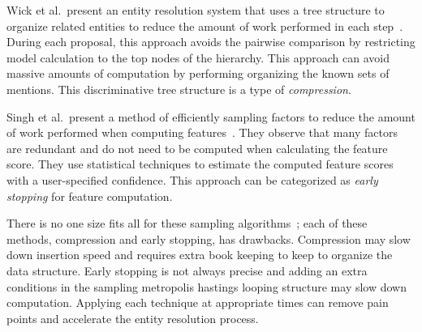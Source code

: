 Wick et al.\ present an entity resolution system that uses a tree structure
to organize related entities to reduce the amount of work performed in each step~\cite{wick2013discriminative}.
During each proposal, this approach avoids the pairwise comparison by restricting model calculation to the top nodes of the hierarchy.
This approach can avoid massive amounts of computation by performing organizing the known sets of mentions.
This discriminative tree structure is a type of \textit{compression}.

Singh et al.\ present a method of efficiently sampling factors to reduce the
amount of work performed when computing features~\cite{singh2012monte}.
They observe that many factors are redundant and do not need to be computed when calculating the feature score.
They use statistical techniques to estimate the computed feature scores with a user-specified confidence.
This approach can be categorized as \textit{early stopping} for feature computation.

There is no one size fits all for these sampling algorithms~\cite{sculley2006compression};
each of these methods, compression and early stopping, has drawbacks.
Compression may slow down insertion speed and requires extra book keeping to keep to organize the data structure.
Early stopping is not always precise and adding an extra conditions in the sampling metropolis hastings looping structure may slow down computation.
Applying each technique at appropriate times can remove pain points and accelerate the entity resolution process.

